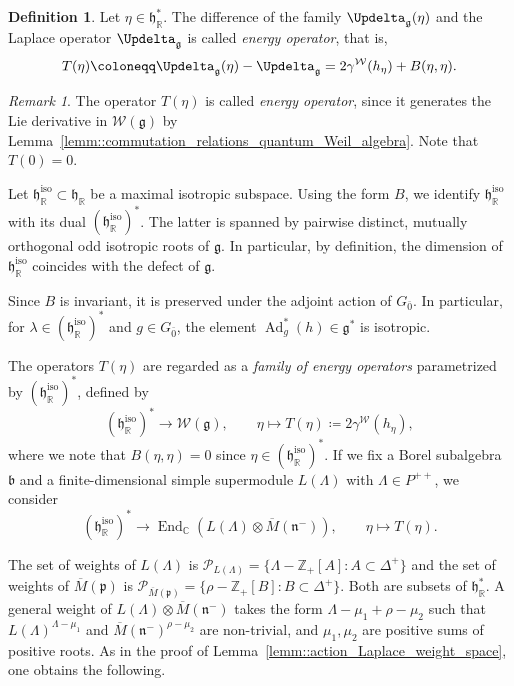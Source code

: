 \documentclass[11pt]{amsart}
\newcommand{\End}{\operatorname{End}}
\def\CC{{\mathbb C}}
\def\RR{{\mathbb R}}
\def\hh{{\mathfrak h}}
\def\pp{{\mathfrak p}}
\def\bb{{\mathfrak b}}
\def\pp{{\mathfrak p}}
\def\nn {{\mathfrak{n}}}
\def\pp{{\mathfrak{p}}}
\def\gg{{\mathfrak{g}}}
\def\ZZ{{\mathbb Z}}
\newcommand{\Ad}{\operatorname{Ad}}
\theoremstyle{plain}
\theoremstyle{remark}
\theoremstyle{definition}
\newtheorem{definition}[theorem]{Definition}
\numberwithin{equation}{section}
\theoremstyle{remark}
\newtheorem{remark}[theorem]{Remark}
\begin{document}
\begin{definition}
 Let $\eta \in \hh_{\RR}^{\ast}$. The difference of the family $\Updelta_{\gg}(\eta)$ and the Laplace operator $\Updelta_{\gg}$ is called \emph{energy operator}, that is, 
 \[
 T(\eta)\coloneqq \Updelta_{\gg}(\eta)-\Updelta_{\gg}=2\gamma^{\mathcal{W}}(h_{\eta})+B(\eta,\eta).
 \]
\end{definition}

\begin{remark}
The operator $T(\eta)$ is called \emph{energy operator}, since it generates the Lie derivative in $\mathcal{W}(\gg)$ by Lemma~\ref{lemm::commutation_relations_quantum_Weil_algebra}. Note that $T(0)=0$.
\end{remark}

Let $\hh_{\RR}^{\mathrm{iso}}\subset\hh_{\RR}$ be a maximal isotropic subspace. Using the form $B$, we identify $\hh_{\RR}^{\mathrm{iso}}$ with its dual $(\hh_{\RR}^{\mathrm{iso}})^{\ast}$. The latter is spanned by pairwise distinct, mutually orthogonal odd isotropic roots of $\gg$. In particular, by definition, the dimension of $\hh_{\RR}^{\mathrm{iso}}$ coincides with the defect of $\gg$.

Since $B$ is invariant, it is preserved under the adjoint action of $G_{\bar{0}}$. In particular, for $\lambda\in(\hh_{\RR}^{\mathrm{iso}})^{\ast}$ and $g\in G_{\bar{0}}$, the element $\Ad^{\ast}_{g}(h)\in\gg^{\ast}$ is isotropic.

The operators $T(\eta)$ are regarded as a \emph{family of energy operators} parametrized by $(\hh_{\RR}^{\mathrm{iso}})^{\ast}$, defined by
\begin{equation}
(\hh_{\RR}^{\mathrm{iso}})^{\ast}\rightarrow\mathcal{W}(\gg),\qquad
\eta\mapsto T(\eta)\coloneqq 2\gamma^{\mathcal{W}}(h_{\eta}),
\end{equation}
where we note that $B(\eta,\eta)=0$ since $\eta \in (\hh_{\RR}^{\text{iso}})^{\ast}$.
If we fix a Borel subalgebra $\bb$ and a finite-dimensional simple supermodule $L(\Lambda)$ with $\Lambda \in P^{++}$, we consider
\begin{equation}
(\hh_{\RR}^{\mathrm{iso}})^{\ast}\longrightarrow \End_{\CC}(L(\Lambda)\otimes \overline{M}(\nn^{-})),
\qquad \eta \longmapsto T(\eta).
\end{equation}

The set of weights of $L(\Lambda)$ is $\mathcal{P}_{L(\Lambda)}=\{\Lambda - \ZZ_{+}[A] : A \subset \Delta^{+}\}$ and the set of weights of $\overline{M}(\pp)$ is 
$\mathcal{P}_{\overline{M}(\pp)}=\{\rho-\ZZ_{+}[B] : B \subset \Delta^{+}\}$. Both are subsets of $\hh_{\RR}^{\ast}$. A general weight of $L(\Lambda)\otimes \overline{M}(\nn^{-})$ takes the form $\Lambda-\mu_{1}+\rho-\mu_{2}$ such that $L(\Lambda)^{\Lambda-\mu_{1}}$ and $\overline{M}(\nn^{-})^{\rho-\mu_{2}}$ are non-trivial, and $\mu_{1},\mu_{2}$ are positive sums of positive roots. As in the proof of Lemma~\ref{lemm::action_Laplace_weight_space}, one obtains the following.
\end{document}
